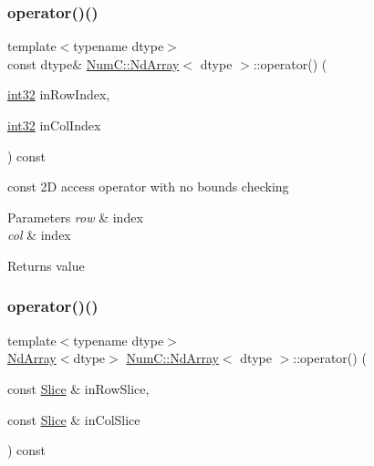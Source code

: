 \subsubsection{\texorpdfstring{operator()()}{operator()()}\hspace{0.1cm}{\footnotesize\ttfamily [2/5]}}
{\footnotesize\ttfamily template$<$typename dtype$>$ \\
const dtype\& \mbox{\hyperlink{class_num_c_1_1_nd_array}{Num\+C\+::\+Nd\+Array}}$<$ dtype $>$\+::operator() (\begin{DoxyParamCaption}\item[{\mbox{\hyperlink{namespace_num_c_aa5a7e69266097d55816d4cdb19542b53}{int32}}}]{in\+Row\+Index,  }\item[{\mbox{\hyperlink{namespace_num_c_aa5a7e69266097d55816d4cdb19542b53}{int32}}}]{in\+Col\+Index }\end{DoxyParamCaption}) const\hspace{0.3cm}{\ttfamily [inline]}}

const 2D access operator with no bounds checking


\begin{DoxyParams}{Parameters}
{\em row} & index \\
\hline
{\em col} & index \\
\hline
\end{DoxyParams}
\begin{DoxyReturn}{Returns}
value 
\end{DoxyReturn}
\mbox{\label{class_num_c_1_1_nd_array_a1aba19daad3acef73ee1538ea75c67cd}} 
\subsubsection{\texorpdfstring{operator()()}{operator()()}\hspace{0.1cm}{\footnotesize\ttfamily [3/5]}}
{\footnotesize\ttfamily template$<$typename dtype$>$ \\
\mbox{\hyperlink{class_num_c_1_1_nd_array}{Nd\+Array}}$<$dtype$>$ \mbox{\hyperlink{class_num_c_1_1_nd_array}{Num\+C\+::\+Nd\+Array}}$<$ dtype $>$\+::operator() (\begin{DoxyParamCaption}\item[{const \mbox{\hyperlink{class_num_c_1_1_slice}{Slice}} \&}]{in\+Row\+Slice,  }\item[{const \mbox{\hyperlink{class_num_c_1_1_slice}{Slice}} \&}]{in\+Col\+Slice }\end{DoxyParamCaption}) const\hspace{0.3cm}{\ttfamily [inline]}}


